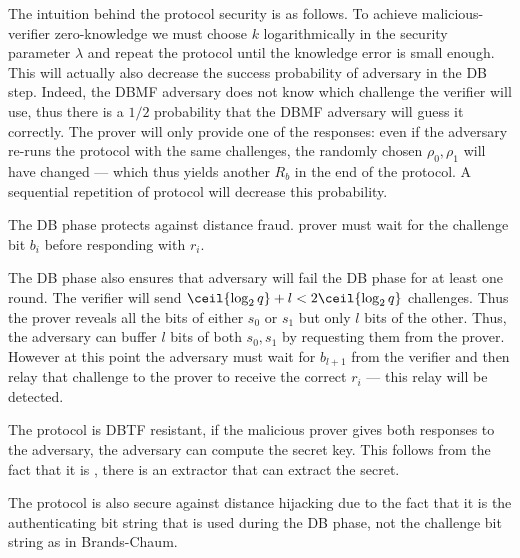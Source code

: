 The intuition behind the protocol security is as follows.
To achieve malicious-verifier zero-knowledge we must choose \(k\) logarithmically in the security parameter \(\lambda\) and repeat the protocol until the knowledge error is small enough.
This will actually also decrease the success probability of  adversary in the \ac{DB} step.
Indeed, the \ac{DBMF} adversary does not know which challenge the verifier will use, thus there is a \(1/2\) probability that the \ac{DBMF} adversary will guess it correctly.
The prover will only provide one of the responses: even if the adversary re-runs the protocol with the same challenges, the randomly chosen \(\rho_0, \rho_1\) will have changed --- which thus yields another \(R_b\) in the end of the protocol.
A sequential repetition of protocol will decrease this probability.

The \ac{DB} phase protects against distance fraud.
 prover must wait for the challenge bit \(b_i\) before responding with \(r_i\).

The \ac{DB} phase also ensures that  adversary will fail the \ac{DB} phase for at least one round.
The verifier will send \(\ceil{\log_2 q} + l < 2\ceil{\log_2 q}\) challenges.
Thus the prover reveals all the bits of either \(s_0\) or \(s_1\) but only \(l\) bits of the other.
Thus, the adversary can buffer \(l\) bits of both \(s_0, s_1\) by requesting them from the prover.
However at this point the adversary must wait for \(b_{l+1}\) from the verifier and then relay that challenge to the prover to receive the correct \(r_i\) --- this relay will be detected.

The protocol is \ac{DBTF} resistant, if the malicious prover gives both 
responses to the adversary, the adversary can compute the secret key.
This follows from the fact that it is , \ie there is an extractor that 
can extract the secret.

The protocol is also secure against distance hijacking due to the fact that it 
is the authenticating bit string that is used during the \ac{DB} phase, not the 
challenge bit string as in Brands-Chaum.
